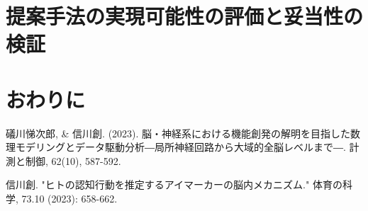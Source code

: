 \documentclass[uplatex,dvipdfmx]{jsarticle}
\begin{document}
\section{提案手法の実現可能性の評価と妥当性の検証}
%

\section{おわりに}




\begin{thebibliography}{9}
 礒川悌次郎, \& 信川創. (2023). 脳・神経系における機能創発の解明を目指した数理モデリングとデータ駆動分析―局所神経回路から大域的全脳レベルまで―. 計測と制御, 62(10), 587-592.

  信川創. "ヒトの認知行動を推定するアイマーカーの脳内メカニズム." 体育の科学, 73.10 (2023): 658-662.
\end{thebibliography}
\end{document}
